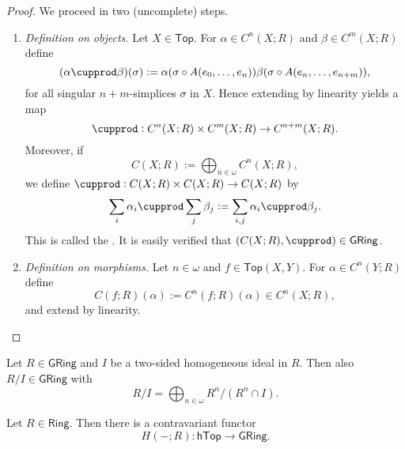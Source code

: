 \begin{proof}
	We proceed in two (uncomplete) steps.
	\begin{enumerate}[label = \textit{Step \arabic*:},wide = 0pt]
		\item \textit{Definition on objects.} Let $X \in \mathsf{Top}$. For $\alpha \in C^n(X;R)$
			and $\beta \in C^m(X;R)$ define
			\begin{equation*}
				(\alpha \cupprod \beta)(\sigma) := \alpha(\sigma \circ A(e_0,\dots,e_n)) \beta(\sigma \circ A(e_n,\dots,e_{n + m})),
			\end{equation*}
			\noindent for all singular $n + m$-simplices $\sigma$ in $X$. Hence extending by linearity yields a map
			\begin{equation*}
				\cupprod : C^n(X;R) \times C^m(X;R) \to C^{n + m}(X;R).
			\end{equation*}
			Moreover, if 
			\begin{equation*}
				C(X;R) := \bigoplus_{n \in \omega } C^n(X;R),
			\end{equation*}
			\noindent we define $\cupprod : C(X;R) \times C(X;R) \to C(X;R)$ by
			\begin{equation*}
				\sum_i \alpha_i \cupprod \sum_j \beta_j := \sum_{i,j} \alpha_i \cupprod \beta_j.
			\end{equation*}
			This is called the . It is easily verified that $(C(X;R),\cupprod) \in \mathsf{GRing}$.
		\item \textit{Definition on morphisms.} Let $n \in \omega$ and $f \in \mathsf{Top}(X,Y)$. For $\alpha \in C^n(Y;R)$ define
			\begin{equation*}
				C(f;R)(\alpha) := C^n(f;R)(\alpha) \in C^n(X;R),
			\end{equation*}
			\noindent and extend by linearity.
	\end{enumerate}
\end{proof}

\begin{lemma}
	\label{lem:graded_quotient}
	Let $R \in \mathsf{GRing}$ and $I$ be a two-sided homogeneous ideal in $R$. Then also $R/I \in \mathsf{GRing}$ with
	\begin{equation*}
		R/I = \bigoplus_{n \in \omega} R^n/(R^n \cap I).
	\end{equation*}
\end{lemma}

\begin{theorem}
	Let $R \in \mathsf{Ring}$. Then there is a contravariant functor
	\begin{equation*}
		H(-;R) : \mathsf{hTop} \to \mathsf{GRing}.
	\end{equation*}
\end{theorem}

